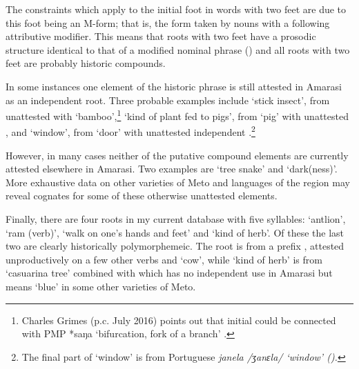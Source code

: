 The constraints which apply to the initial foot in words with two feet
are due to this foot being an M-form; that is,
the form taken by nouns with a following attributive modifier.
This means that roots with two feet have a prosodic structure
identical to that of a modified nominal phrase ()
and all roots with two feet are probably historic compounds.

In some instances one element of the historic phrase is still attested in Amarasi as an independent root.
Three probable examples include  `stick insect',
from unattested  with  `bamboo',\footnote{
		Charles Grimes (p.c. July 2016) points out that
		initial  could be connected with PMP
		*saŋa `bifurcation, fork of a branch' \cite{bltr}.}
 `kind of plant fed to pigs', from 
`pig' with unattested ,
and  `window', from  `door'
with unattested independent .\footnote{
		The final part of  `window' is
		from Portuguese \it{janela} /ʒanɛla/ `window' ().}

However, in many cases neither of the putative compound elements
are currently attested elsewhere in Amarasi.
Two examples are  `tree snake' and  `dark(ness)'.
More exhaustive data on other varieties of Meto and languages of the region
may reveal cognates for some of these otherwise unattested elements.

Finally, there are four roots in my current database with five syllables:
 `antlion',  `ram (verb)',
 `walk on one's hands and feet' and  `kind of herb'.
Of these the last two are clearly historically polymorphemeic.
The root  is from a prefix ,
attested unproductively on a few other verbs and  `cow',
while  `kind of herb' is from  `casuarina tree'
combined with  which has no independent use in Amarasi but
means `blue' in some other varieties of Meto.
